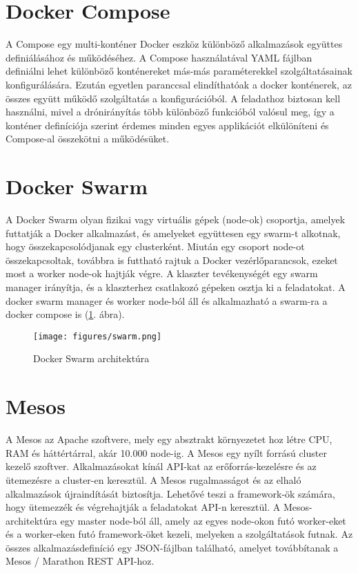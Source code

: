 \section{Docker Compose}
A Compose egy multi-konténer Docker eszköz különböző alkalmazások együttes definiálásához és működéséhez. A Compose használatával YAML fájlban definiálni lehet különböző konténereket más-más paraméterekkel szolgáltatásainak konfigurálására. Ezután egyetlen paranccsal elindíthatóak a docker konténerek, az összes együtt működő szolgáltatás a konfigurációból. \cite{compose} A feladathoz biztosan kell használni, mivel a drónirányítás több különböző funkcióból valósul meg, így a konténer definíciója szerint érdemes minden egyes applikációt elkülöníteni és Compose-al összekötni a működésüket.

\section{Docker Swarm}
A Docker Swarm olyan fizikai vagy virtuális gépek (node-ok) csoportja, amelyek futtatják a Docker alkalmazást, és amelyeket együttesen egy swarm-t alkotnak, hogy összekapcsolódjanak egy clusterként. Miután egy csoport node-ot összekapcsoltak, továbbra is futtható rajtuk a Docker vezérlőparancsok, ezeket most a worker node-ok hajtják végre. A klaszter tevékenységét egy swarm manager irányítja, és a klaszterhez csatlakozó gépeken osztja ki a feladatokat. A docker swarm manager és worker node-ból áll és alkalmazható a swarm-ra a docker compose is (\ref{fig:swarm}. ábra).
\begin{figure}
	\centering
	\texttt{[image: figures/swarm.png]}
	\caption{Docker Swarm architektúra \cite{docker-swarm}}
	\label{fig:swarm}
\end{figure}

\section{Mesos}
A Mesos az Apache szoftvere, mely egy absztrakt környezetet hoz létre CPU, RAM és háttértárral, akár 10.000 node-ig. A Mesos egy nyílt forrású cluster kezelő szoftver. Alkalmazásokat kínál API-kat az erőforrás-kezelésre és az ütemezésre a cluster-en keresztül.  A Mesos rugalmasságot és az elhaló alkalmazások újraindítását biztosítja. Lehetővé teszi a framework-ök számára, hogy ütemezzék és végrehajtják a feladatokat API-n keresztül. A Mesos-architektúra egy master node-ból áll, amely az egyes node-okon futó worker-eket és a worker-eken futó framework-öket kezeli, melyeken a szolgáltatások futnak. Az összes alkalmazásdefiníció egy JSON-fájlban található, amelyet továbbítanak a Mesos / Marathon REST API-hoz.

